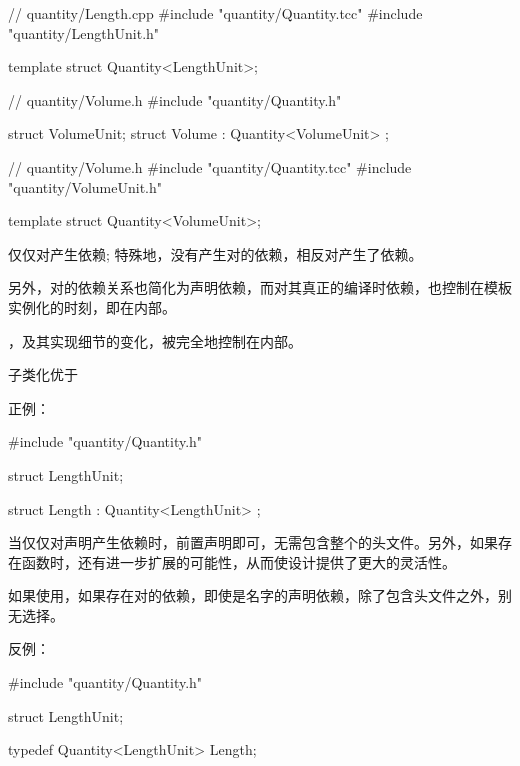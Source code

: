 \begin{content}
\begin{leftbar}
\begin{c++}
// quantity/Length.cpp
#include "quantity/Quantity.tcc"
#include "quantity/LengthUnit.h"

template struct Quantity<LengthUnit>;
\end{c++}
\end{leftbar}

\begin{leftbar}
\begin{c++}
// quantity/Volume.h 
#include "quantity/Quantity.h"

struct VolumeUnit;
struct Volume : Quantity<VolumeUnit> {};
\end{c++}
\end{leftbar}

\begin{leftbar}
\begin{c++}
// quantity/Volume.h 
#include "quantity/Quantity.tcc"
#include "quantity/VolumeUnit.h"

template struct Quantity<VolumeUnit>;
\end{c++}
\end{leftbar}

仅仅对产生依赖; 特殊地，没有产生对的依赖，相反对产生了依赖。

另外，对的依赖关系也简化为声明依赖，而对其真正的编译时依赖，也控制在模板实例化的时刻，即在内部。

，及其实现细节的变化，被完全地控制在内部。

\begin{advise}
子类化优于
\end{advise}

正例：
\begin{leftbar}
\begin{c++}
#include "quantity/Quantity.h"

struct LengthUnit;

struct Length : Quantity<LengthUnit> {};
\end{c++}
\end{leftbar}

当仅仅对声明产生依赖时，前置声明即可，无需包含整个的头文件。另外，如果存在函数时，还有进一步扩展的可能性，从而使设计提供了更大的灵活性。

如果使用，如果存在对的依赖，即使是名字的声明依赖，除了包含头文件之外，别无选择。

反例：
\begin{leftbar}
\begin{c++}
#include "quantity/Quantity.h"

struct LengthUnit;

typedef Quantity<LengthUnit> Length;
\end{c++}
\end{leftbar}

\end{content}
